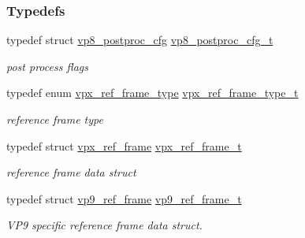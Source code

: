 \subsubsection*{Typedefs}
\begin{DoxyCompactItemize}
\item 
typedef struct \hyperlink{structvp8__postproc__cfg}{vp8\+\_\+postproc\+\_\+cfg} \hyperlink{group__vp8_ga7e9e955211711b2f915bc59640cc0ef0}{vp8\+\_\+postproc\+\_\+cfg\+\_\+t}
\begin{DoxyCompactList}\small\item\em post process flags \end{DoxyCompactList}\item 
typedef enum \hyperlink{group__vp8_gad8ab72d8a178a68339dad2987358c331}{vpx\+\_\+ref\+\_\+frame\+\_\+type} \hyperlink{group__vp8_ga75ac0689a81bf7202382a225c5b451b4}{vpx\+\_\+ref\+\_\+frame\+\_\+type\+\_\+t}
\begin{DoxyCompactList}\small\item\em reference frame type \end{DoxyCompactList}\item 
typedef struct \hyperlink{structvpx__ref__frame}{vpx\+\_\+ref\+\_\+frame} \hyperlink{group__vp8_ga9157c53799cdafd12ebee65d04e16825}{vpx\+\_\+ref\+\_\+frame\+\_\+t}
\begin{DoxyCompactList}\small\item\em reference frame data struct \end{DoxyCompactList}\item 
typedef struct \hyperlink{structvp9__ref__frame}{vp9\+\_\+ref\+\_\+frame} \hyperlink{group__vp8_gab0371044ac07cca814583624b6776005}{vp9\+\_\+ref\+\_\+frame\+\_\+t}
\begin{DoxyCompactList}\small\item\em V\+P9 specific reference frame data struct. \end{DoxyCompactList}\end{DoxyCompactItemize}
